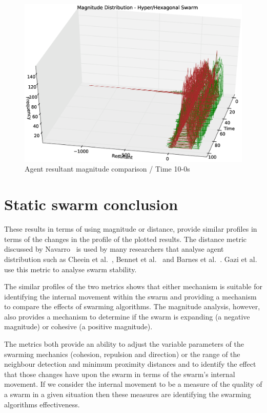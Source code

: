 \begin{figure}[H]
\begin{center}
\includegraphics[width=13cm]{CHAPTER-5/figures/StabilityMagHyperHexagonal3D2}
\end{center}
\caption{Agent resultant magnitude comparison / Time 10-0s\label{methods:StabilityMagHyperHexagonal3D2}}
\end{figure}

\section{Static swarm conclusion\label{section:staticConclusion}}
These results in terms of using magnitude or distance, provide similar profiles in terms of the changes in the profile of the plotted results. The distance metric discussed by Navarro~\cite{NIM:09} is used by many researchers that analyse agent distribution such as Cheein et al.~\cite{HGCTREA:15}, Bennet et al.~\cite{BM:09} and Barnes et al.~\cite{BAF:06, BAFVM:06, BFV:07, BFV:09}. Gazi et al.~\cite{GP:02, GP:04, GP:04a, GP:05} use this metric to analyse swarm stability. 

The similar profiles of the two metrics shows that either mechanism is suitable for identifying the internal movement within the swarm and providing a mechanism to compare the effects of swarming algorithms. The magnitude analysis, however, also provides a mechanism to determine if the swarm is expanding (a negative magnitude) or cohesive (a positive magnitude).

The metrics both provide an ability to adjust the variable parameters of the swarming mechanics (cohesion, repulsion and direction) or the range of the neighbour detection and minimum proximity distances and to identify the effect that those changes have upon the swarm in terms of the swarm's internal movement. If we consider the internal movement to be a measure of the quality of a swarm in a given situation then these measures are identifying the swarming algorithms effectiveness.

